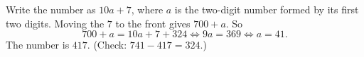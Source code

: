 Write the number as $10a+7$, where $a$ is the two-digit number formed by its first two digits. Moving the $7$ to the front gives $700+a$. So
\[700+a=10a+7+324\iff9a=369\iff a=41.\]
The number is $\boxed{417}$. (Check: $741-417=324$.)
